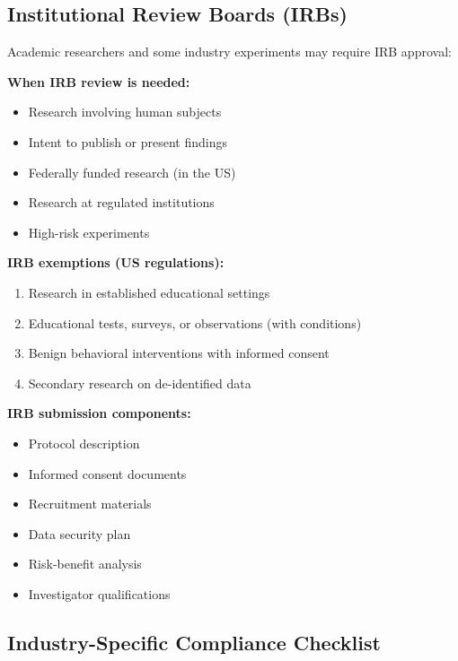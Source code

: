 \subsection{Institutional Review Boards (IRBs)}

Academic researchers and some industry experiments may require IRB approval:

\textbf{When IRB review is needed:}
\begin{itemize}
    \item Research involving human subjects
    \item Intent to publish or present findings
    \item Federally funded research (in the US)
    \item Research at regulated institutions
    \item High-risk experiments
\end{itemize}

\textbf{IRB exemptions (US regulations):}
\begin{enumerate}
    \item Research in established educational settings
    \item Educational tests, surveys, or observations (with conditions)
    \item Benign behavioral interventions with informed consent
    \item Secondary research on de-identified data
\end{enumerate}

\textbf{IRB submission components:}
\begin{itemize}
    \item Protocol description
    \item Informed consent documents
    \item Recruitment materials
    \item Data security plan
    \item Risk-benefit analysis
    \item Investigator qualifications
\end{itemize}

\subsection{Industry-Specific Compliance Checklist}

